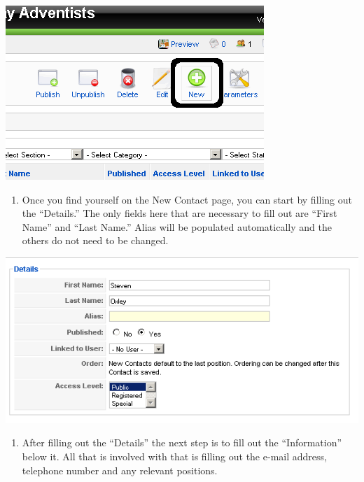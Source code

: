\documentclass[letterpaper,10pt,english]{manual}
\begin{document}
{\hfill\includegraphics{directoryContactsNewButton1.png}\hfill}
\begin{enumerate}
\item {} 
Once you find yourself on the New Contact page, you can start by filling out the “Details.”  The only fields here that are necessary to fill out are “First Name” and “Last Name.”  Alias will be populated automatically and the others do not need to be changed.

\end{enumerate}

{\hfill\includegraphics{directoryContactsNewContactDetails1.png}\hfill}
\begin{enumerate}
\item {} 
After filling out the “Details” the next step is to fill out the “Information” below it.  All that is involved with that is filling out the e-mail address, telephone number and any relevant positions.

\end{enumerate}
\end{document}
